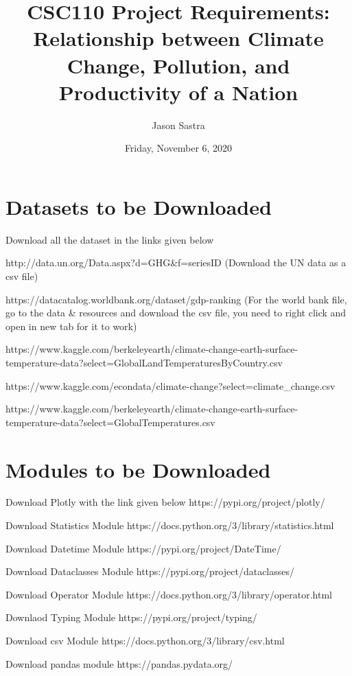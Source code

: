 \documentclass[fontsize=11pt]{article}
\title{CSC110 Project Requirements: Relationship between Climate Change, Pollution, and Productivity of a Nation}
\author{Jason Sastra}
\date{Friday, November 6, 2020}
\begin{document}
\maketitle

\section*{Datasets to be Downloaded}
Download all the dataset in the links given below

http://data.un.org/Data.aspx?d=GHG&f=seriesID%
(Download the UN data as a csv file)

https://datacatalog.worldbank.org/dataset/gdp-ranking
(For the world bank file, go to the data & resources and download the csv file, you need to right click and open in new tab for it to work)

https://www.kaggle.com/berkeleyearth/climate-change-earth-surface-temperature-data?select=GlobalLandTemperaturesByCountry.csv

https://www.kaggle.com/econdata/climate-change?select=climate\_change.csv

https://www.kaggle.com/berkeleyearth/climate-change-earth-surface-temperature-data?select=GlobalTemperatures.csv


\section{Modules to be Downloaded}

Download Plotly with the link given below
https://pypi.org/project/plotly/

Download Statistics Module
https://docs.python.org/3/library/statistics.html

Download Datetime Module
https://pypi.org/project/DateTime/

Download Dataclasses Module
https://pypi.org/project/dataclasses/

Download Operator Module
https://docs.python.org/3/library/operator.html

Downlaod Typing Module
https://pypi.org/project/typing/

Download csv Module
https://docs.python.org/3/library/csv.html

Download pandas module
https://pandas.pydata.org/
\end{document}
